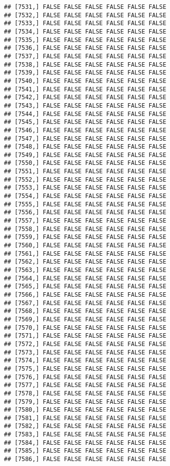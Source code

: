\documentclass[
]{article}
\begin{document}
\begin{verbatim}
## [7531,] FALSE FALSE FALSE FALSE FALSE FALSE
## [7532,] FALSE FALSE FALSE FALSE FALSE FALSE
## [7533,] FALSE FALSE FALSE FALSE FALSE FALSE
## [7534,] FALSE FALSE FALSE FALSE FALSE FALSE
## [7535,] FALSE FALSE FALSE FALSE FALSE FALSE
## [7536,] FALSE FALSE FALSE FALSE FALSE FALSE
## [7537,] FALSE FALSE FALSE FALSE FALSE FALSE
## [7538,] FALSE FALSE FALSE FALSE FALSE FALSE
## [7539,] FALSE FALSE FALSE FALSE FALSE FALSE
## [7540,] FALSE FALSE FALSE FALSE FALSE FALSE
## [7541,] FALSE FALSE FALSE FALSE FALSE FALSE
## [7542,] FALSE FALSE FALSE FALSE FALSE FALSE
## [7543,] FALSE FALSE FALSE FALSE FALSE FALSE
## [7544,] FALSE FALSE FALSE FALSE FALSE FALSE
## [7545,] FALSE FALSE FALSE FALSE FALSE FALSE
## [7546,] FALSE FALSE FALSE FALSE FALSE FALSE
## [7547,] FALSE FALSE FALSE FALSE FALSE FALSE
## [7548,] FALSE FALSE FALSE FALSE FALSE FALSE
## [7549,] FALSE FALSE FALSE FALSE FALSE FALSE
## [7550,] FALSE FALSE FALSE FALSE FALSE FALSE
## [7551,] FALSE FALSE FALSE FALSE FALSE FALSE
## [7552,] FALSE FALSE FALSE FALSE FALSE FALSE
## [7553,] FALSE FALSE FALSE FALSE FALSE FALSE
## [7554,] FALSE FALSE FALSE FALSE FALSE FALSE
## [7555,] FALSE FALSE FALSE FALSE FALSE FALSE
## [7556,] FALSE FALSE FALSE FALSE FALSE FALSE
## [7557,] FALSE FALSE FALSE FALSE FALSE FALSE
## [7558,] FALSE FALSE FALSE FALSE FALSE FALSE
## [7559,] FALSE FALSE FALSE FALSE FALSE FALSE
## [7560,] FALSE FALSE FALSE FALSE FALSE FALSE
## [7561,] FALSE FALSE FALSE FALSE FALSE FALSE
## [7562,] FALSE FALSE FALSE FALSE FALSE FALSE
## [7563,] FALSE FALSE FALSE FALSE FALSE FALSE
## [7564,] FALSE FALSE FALSE FALSE FALSE FALSE
## [7565,] FALSE FALSE FALSE FALSE FALSE FALSE
## [7566,] FALSE FALSE FALSE FALSE FALSE FALSE
## [7567,] FALSE FALSE FALSE FALSE FALSE FALSE
## [7568,] FALSE FALSE FALSE FALSE FALSE FALSE
## [7569,] FALSE FALSE FALSE FALSE FALSE FALSE
## [7570,] FALSE FALSE FALSE FALSE FALSE FALSE
## [7571,] FALSE FALSE FALSE FALSE FALSE FALSE
## [7572,] FALSE FALSE FALSE FALSE FALSE FALSE
## [7573,] FALSE FALSE FALSE FALSE FALSE FALSE
## [7574,] FALSE FALSE FALSE FALSE FALSE FALSE
## [7575,] FALSE FALSE FALSE FALSE FALSE FALSE
## [7576,] FALSE FALSE FALSE FALSE FALSE FALSE
## [7577,] FALSE FALSE FALSE FALSE FALSE FALSE
## [7578,] FALSE FALSE FALSE FALSE FALSE FALSE
## [7579,] FALSE FALSE FALSE FALSE FALSE FALSE
## [7580,] FALSE FALSE FALSE FALSE FALSE FALSE
## [7581,] FALSE FALSE FALSE FALSE FALSE FALSE
## [7582,] FALSE FALSE FALSE FALSE FALSE FALSE
## [7583,] FALSE FALSE FALSE FALSE FALSE FALSE
## [7584,] FALSE FALSE FALSE FALSE FALSE FALSE
## [7585,] FALSE FALSE FALSE FALSE FALSE FALSE
## [7586,] FALSE FALSE FALSE FALSE FALSE FALSE

\end{verbatim}
\end{document}
